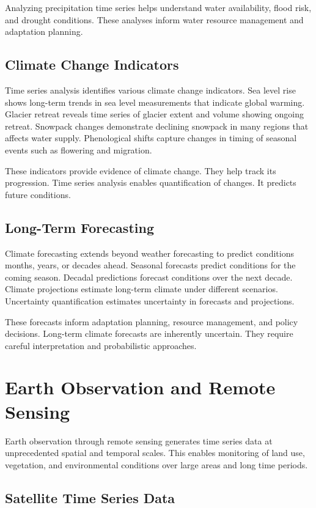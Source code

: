 Analyzing precipitation time series helps understand water availability, flood risk, and drought conditions. These analyses inform water resource management and adaptation planning.

\subsection{Climate Change Indicators}

Time series analysis identifies various climate change indicators. Sea level rise shows long-term trends in sea level measurements that indicate global warming. Glacier retreat reveals time series of glacier extent and volume showing ongoing retreat. Snowpack changes demonstrate declining snowpack in many regions that affects water supply. Phenological shifts capture changes in timing of seasonal events such as flowering and migration.

These indicators provide evidence of climate change. They help track its progression. Time series analysis enables quantification of changes. It predicts future conditions.

\subsection{Long-Term Forecasting}

Climate forecasting extends beyond weather forecasting to predict conditions months, years, or decades ahead. Seasonal forecasts predict conditions for the coming season. Decadal predictions forecast conditions over the next decade. Climate projections estimate long-term climate under different scenarios. Uncertainty quantification estimates uncertainty in forecasts and projections.

These forecasts inform adaptation planning, resource management, and policy decisions. Long-term climate forecasts are inherently uncertain. They require careful interpretation and probabilistic approaches.

\section{Earth Observation and Remote Sensing}

Earth observation through remote sensing generates time series data at unprecedented spatial and temporal scales. This enables monitoring of land use, vegetation, and environmental conditions over large areas and long time periods.

\subsection{Satellite Time Series Data}

